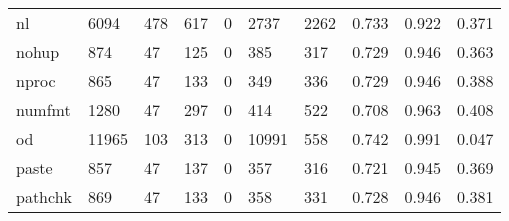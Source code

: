 \begin{longtable}{lp{1.3cm}p{1.3cm}p{1.3cm}p{1.3cm}p{1.3cm}p{1.3cm}p{1.3cm}p{1.3cm}p{1.3cm}}
nl        &                   6094 &                                478 &                               617 &                                0 &                              2737 &                            2262 &                                   0.733 &                                  0.922 &                                0.371 \\
nohup     &                    874 &                                 47 &                               125 &                                0 &                               385 &                             317 &                                   0.729 &                                  0.946 &                                0.363 \\
nproc     &                    865 &                                 47 &                               133 &                                0 &                               349 &                             336 &                                   0.729 &                                  0.946 &                                0.388 \\
numfmt    &                   1280 &                                 47 &                               297 &                                0 &                               414 &                             522 &                                   0.708 &                                  0.963 &                                0.408 \\
od        &                  11965 &                                103 &                               313 &                                0 &                             10991 &                             558 &                                   0.742 &                                  0.991 &                                0.047 \\
paste     &                    857 &                                 47 &                               137 &                                0 &                               357 &                             316 &                                   0.721 &                                  0.945 &                                0.369 \\
pathchk   &                    869 &                                 47 &                               133 &                                0 &                               358 &                             331 &                                   0.728 &                                  0.946 &                                0.381 \\

\end{longtable}
